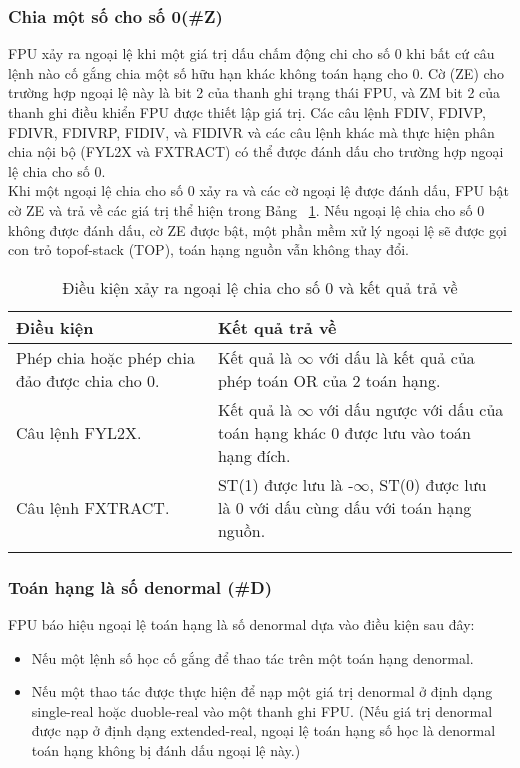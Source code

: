 	\subsubsection*{Chia một số cho số 0(\#Z)}
		FPU xảy ra ngoại lệ khi một giá trị dấu chấm động chi cho số 0 khi bất cứ câu lệnh nào cố gắng chia một số hữu hạn khác không toán hạng cho 0. Cờ (ZE) cho trường hợp ngoại lệ này là bit 2 của thanh ghi trạng thái FPU, và ZM  bit 2 của thanh ghi điều khiển FPU được thiết lập giá trị. Các câu lệnh FDIV, FDIVP, FDIVR, FDIVRP, FIDIV, và FIDIVR và các câu lệnh khác mà thực hiện phân chia nội bộ (FYL2X và FXTRACT) có thể được đánh dấu cho trường hợp ngoại lệ chia cho số 0. \\
		
		Khi một ngoại lệ chia cho số 0 xảy ra và các cờ ngoại lệ được đánh dấu, FPU bật cờ ZE và trả về các giá trị thể hiện trong Bảng ~\ref{tb:ChiaCho0}. Nếu ngoại lệ chia cho số 0 không được đánh dấu, cờ ZE được bật, một phần mềm xử lý ngoại lệ sẽ được gọi con trỏ topof-stack (TOP), toán hạng nguồn vẫn không thay đổi.
		\begin{longtable}{|m{6cm}|m{8cm}|}
				\hline
					Điều kiện & Kết quả trả về \\
				\hline
				\hline
					Phép chia hoặc phép chia đảo được chia cho 0. & Kết quả là $\mathbb{\infty}$ với dấu là kết quả của phép toán OR của 2 toán hạng. \\
				\hline
					Câu lệnh FYL2X. &  Kết quả là $\mathbb{\infty}$ với dấu ngược với dấu của toán hạng khác 0 được lưu vào toán hạng đích. \\
				\hline
					Câu lệnh FXTRACT. & ST(1) được lưu là -$\mathbb{\infty}$, ST(0) được lưu là 0 với dấu cùng dấu với toán hạng nguồn.\\
				\hline
					\caption{Điều kiện xảy ra ngoại lệ chia cho số 0 và kết quả trả về}					
					\label{tb:ChiaCho0}
		\end{longtable}		
		
		\subsubsection*{Toán hạng là số denormal (\#D)}
		FPU báo hiệu ngoại lệ toán hạng là số denormal dựa vào điều kiện sau đây:
			\begin{itemize}
			\renewcommand{\labelitemi}{\textbullet}
			\item Nếu một lệnh số học cố gắng để thao tác trên một toán hạng denormal.
			\item  Nếu một thao tác được thực hiện để nạp một giá trị denormal ở định dạng single-real hoặc duoble-real vào một thanh ghi FPU. (Nếu giá trị denormal được nạp ở định dạng extended-real, ngoại lệ toán hạng số học là denormal toán hạng không bị đánh dấu ngoại lệ này.)
			\end{itemize}
 	
